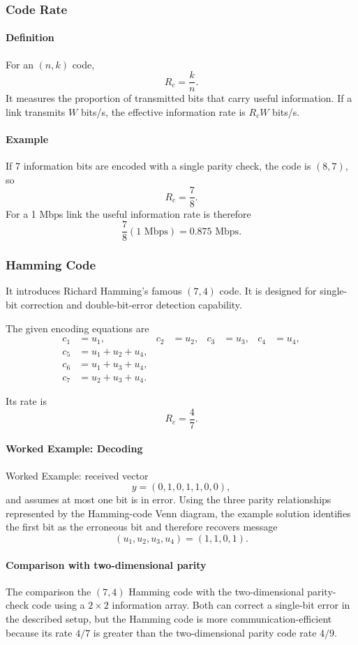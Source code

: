 \documentclass[12pt]{article}
\newcommand{\Definition}{\paragraph{Definition}}
\newcommand{\Example}{\paragraph{Example}}
\begin{document}
\subsubsection{Code Rate}
\Definition For an $(n,k)$ code,
\[
R_c=\frac{k}{n}.
\]
It measures the proportion of transmitted bits that carry useful information. If a link transmits $W$ bits/s, the effective information rate is $R_cW$ bits/s.

\Example
If 7 information bits are encoded with a single parity check, the code is $(8,7)$, so
\[
R_c=\frac78.
\]
For a 1 Mbps link the useful information rate is therefore
\[
\frac78(1\text{ Mbps})=0.875\text{ Mbps}.
\]

\subsubsection{Hamming Code}
It introduces Richard Hamming's famous $(7,4)$ code. It is designed for single-bit correction and double-bit-error detection capability.

The given encoding equations are
\[
\begin{aligned}
 c_1&=u_1, & c_2&=u_2, & c_3&=u_3, & c_4&=u_4,\\
 c_5&=u_1+u_2+u_4,\\
 c_6&=u_1+u_3+u_4,\\
 c_7&=u_2+u_3+u_4.
\end{aligned}
\]

Its rate is
\[
R_c=\frac47.
\]

\paragraph{Worked Example: Decoding}
Worked Example: received vector
\[
y=(0,1,0,1,1,0,0),
\]
and assumes at most one bit is in error. Using the three parity relationships represented by the Hamming-code Venn diagram, the example solution identifies the first bit as the erroneous bit and therefore recovers message
\[
(u_1,u_2,u_3,u_4)=(1,1,0,1).
\]

\paragraph{Comparison with two-dimensional parity}
The comparison the $(7,4)$ Hamming code with the two-dimensional parity-check code using a $2\times2$ information array. Both can correct a single-bit error in the described setup, but the Hamming code is more communication-efficient because its rate $4/7$ is greater than the two-dimensional parity code rate $4/9$.
\end{document}
